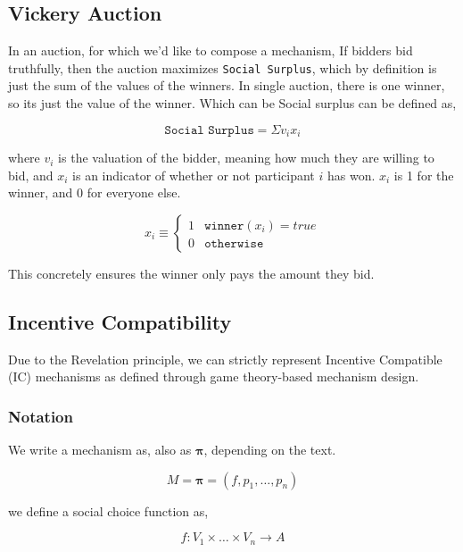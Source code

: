 \documentclass[12pt, titlepage, twocolumn]{report}
\begin{document}
\subsection{Vickery Auction}

In an auction, for which we'd like to compose a mechanism, If bidders bid truthfully, then the auction maximizes \texttt{Social Surplus}, which by definition is just the sum of the values of the winners. In single auction, there is one winner, so its just the value of the winner. Which can be Social surplus can be defined as,

\begin{equation}
\texttt{Social Surplus} = \Sigma v_i x_i
\end{equation}

where \(v_i\) is the valuation of the bidder, meaning how much they are willing to bid, and \(x_i\) is an indicator of whether or not participant \(i\) has won. \(x_i\) is 1 for the winner, and 0 for everyone else.

\begin{equation}
	x_i \equiv
	\begin{cases}
	 1 & \texttt{winner}(x_i) = true \\
	 0 & \texttt{otherwise}
	\end{cases}
\end{equation}

This concretely ensures the winner only pays the amount they bid.


\subsection{Incentive Compatibility}
Due to the Revelation principle, we can strictly represent Incentive Compatible (IC) mechanisms as defined through game theory-based mechanism design. 

\subsubsection{Notation}
We write a mechanism as, also as \(\boldsymbol{\pi}\), depending on the text.

\begin{equation}
M = \boldsymbol{\pi} = (f, p_1, \ldots, p_n)
\end{equation}

we define a social choice function as,

\begin{equation}
f: V_1 \times \ldots \times V_n \rightarrow A
\end{equation}
\end{document}
